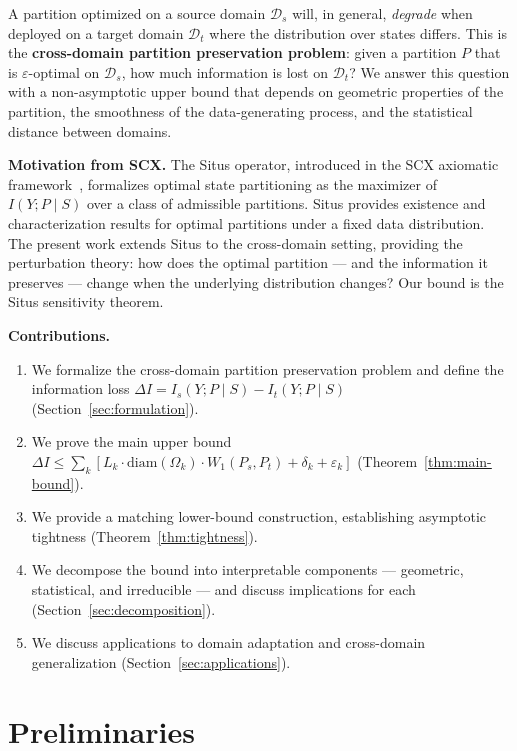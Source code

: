 \documentclass[12pt,a4paper]{article}
\newcommand{\cD}{\mathcal{D}}
\newcommand{\Wass}{W_1}
\newcommand{\diam}{\mathrm{diam}}
\begin{document}
A partition optimized on a source domain $\cD_s$ will, in general,
\emph{degrade} when deployed on a target domain $\cD_t$ where the
distribution over states differs.  This is the \textbf{cross-domain
partition preservation problem}: given a partition $P$ that is
$\varepsilon$-optimal on $\cD_s$, how much information is lost on
$\cD_t$?  We answer this question with a non-asymptotic upper bound that
depends on geometric properties of the partition, the smoothness of the
data-generating process, and the statistical distance between domains.

\medskip\noindent
\textbf{Motivation from SCX.}
The Situs operator, introduced in the SCX axiomatic
framework~\citep{scx2024situs}, formalizes optimal state partitioning as
the maximizer of $I(Y;P\mid S)$ over a class of admissible partitions.
Situs provides existence and characterization results for optimal
partitions under a fixed data distribution.  The present work extends
Situs to the cross-domain setting, providing the perturbation theory:
how does the optimal partition — and the information it preserves —
change when the underlying distribution changes?  Our bound is the
Situs sensitivity theorem.

\medskip\noindent
\textbf{Contributions.}
\begin{enumerate}[label=(\arabic*)]
    \item We formalize the cross-domain partition preservation problem and
          define the information loss $\Delta I = I_s(Y;P\mid S) -
          I_t(Y;P\mid S)$ (Section~\ref{sec:formulation}).
    \item We prove the main upper bound
          $\Delta I \leq \sum_{k}[L_k\cdot\diam(\Omega_k)\cdot\Wass(P_s,P_t)
          + \delta_k + \varepsilon_k]$
          (Theorem~\ref{thm:main-bound}).
    \item We provide a matching lower-bound construction, establishing
          asymptotic tightness (Theorem~\ref{thm:tightness}).
    \item We decompose the bound into interpretable components — geometric,
          statistical, and irreducible — and discuss implications for
          each (Section~\ref{sec:decomposition}).
    \item We discuss applications to domain adaptation and cross-domain
          generalization (Section~\ref{sec:applications}).
\end{enumerate}

\section{Preliminaries}
\label{sec:prelim}
\end{document}
